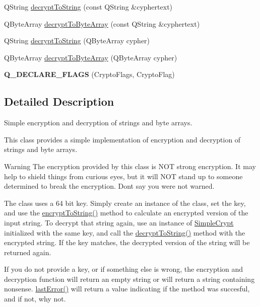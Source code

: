 \begin{DoxyCompactItemize}
\item 
Q\+String \hyperlink{classSimpleCrypt_aa454cf372b534fd5ffaa2c5bd0fa57ea}{decrypt\+To\+String} (const Q\+String \&cyphertext)
\item 
Q\+Byte\+Array \hyperlink{classSimpleCrypt_ad6785e087d449a1aa80c39248e98fcda}{decrypt\+To\+Byte\+Array} (const Q\+String \&cyphertext)
\item 
Q\+String \hyperlink{classSimpleCrypt_ad1a3257cefee43773803ec1b12654f92}{decrypt\+To\+String} (Q\+Byte\+Array cypher)
\item 
Q\+Byte\+Array \hyperlink{classSimpleCrypt_a4babb69e45849f672574a26b6433c85a}{decrypt\+To\+Byte\+Array} (Q\+Byte\+Array cypher)
\item 
\mbox{\label{classSimpleCrypt_a710fb3871372ccddd6450f73afca24eb}} 
{\bfseries Q\+\_\+\+D\+E\+C\+L\+A\+R\+E\+\_\+\+F\+L\+A\+GS} (Crypto\+Flags, Crypto\+Flag)
\end{DoxyCompactItemize}


\subsection{Detailed Description}
Simple encryption and decryption of strings and byte arrays. 

This class provides a simple implementation of encryption and decryption of strings and byte arrays.

\begin{DoxyWarning}{Warning}
The encryption provided by this class is N\+OT strong encryption. It may help to shield things from curious eyes, but it will N\+OT stand up to someone determined to break the encryption. Don\textquotesingle{}t say you were not warned.
\end{DoxyWarning}
The class uses a 64 bit key. Simply create an instance of the class, set the key, and use the \hyperlink{classSimpleCrypt_af26a3d3c6cef9732190c1d2c6a53a5b5}{encrypt\+To\+String()} method to calculate an encrypted version of the input string. To decrypt that string again, use an instance of \hyperlink{classSimpleCrypt}{Simple\+Crypt} initialized with the same key, and call the \hyperlink{classSimpleCrypt_aa454cf372b534fd5ffaa2c5bd0fa57ea}{decrypt\+To\+String()} method with the encrypted string. If the key matches, the decrypted version of the string will be returned again.

If you do not provide a key, or if something else is wrong, the encryption and decryption function will return an empty string or will return a string containing nonsense. \hyperlink{classSimpleCrypt_acb412b13386bf2bcb31552bc40949b39}{last\+Error()} will return a value indicating if the method was succesful, and if not, why not.

